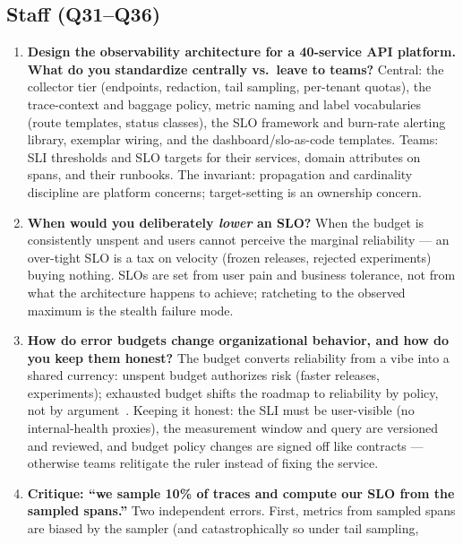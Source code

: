 \subsection*{Staff (Q31--Q36)}
\begin{enumerate}[label=\textbf{Q\arabic*.}, leftmargin=1.6cm, start=31]
  \item \textbf{Design the observability architecture for a 40-service API
        platform. What do you standardize centrally vs.\ leave to teams?}
        Central: the collector tier (endpoints, redaction, tail sampling,
        per-tenant quotas), the trace-context and baggage policy, metric
        naming and label vocabularies (route templates, status classes),
        the SLO framework and burn-rate alerting library, exemplar wiring,
        and the dashboard/slo-as-code templates. Teams: SLI thresholds and
        SLO targets for their services, domain attributes on spans, and
        their runbooks. The invariant: propagation and cardinality
        discipline are platform concerns; target-setting is an ownership
        concern.
  \item \textbf{When would you deliberately \emph{lower} an SLO?}
        When the budget is consistently unspent and users cannot perceive
        the marginal reliability --- an over-tight SLO is a tax on velocity
        (frozen releases, rejected experiments) buying nothing. SLOs are
        set from user pain and business tolerance, not from what the
        architecture happens to achieve; ratcheting to the observed maximum
        is the stealth failure mode.
  \item \textbf{How do error budgets change organizational behavior, and
        how do you keep them honest?}
        The budget converts reliability from a vibe into a shared currency:
        unspent budget authorizes risk (faster releases, experiments);
        exhausted budget shifts the roadmap to reliability by policy, not
        by argument~\cite{beyer2016sre}. Keeping it honest: the SLI must be
        user-visible (no internal-health proxies), the measurement window
        and query are versioned and reviewed, and budget policy changes are
        signed off like contracts --- otherwise teams relitigate the ruler
        instead of fixing the service.
  \item \textbf{Critique: ``we sample 10\% of traces and compute our SLO
        from the sampled spans.''}
        Two independent errors. First, metrics from sampled spans are
        biased by the sampler (and catastrophically so under tail sampling,

\end{enumerate}

